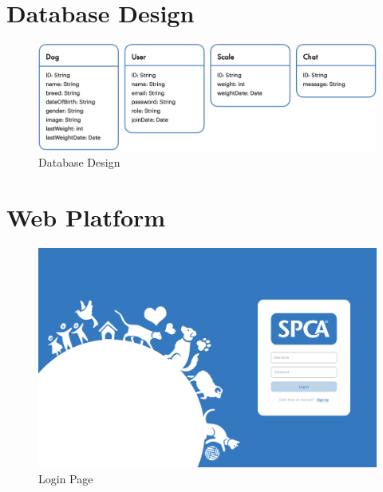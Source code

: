 \chapter{Database Design}






\begin{figure}[h]
\centering
\includegraphics[width=\textwidth]{proposal/parts/database.png}
\caption{Database Design}
\end{figure}

\chapter{Web Platform}

\begin{figure}[h]
\centering
\includegraphics[width=\textwidth]{proposal/parts/login.png}
\caption{Login Page}
\end{figure}

